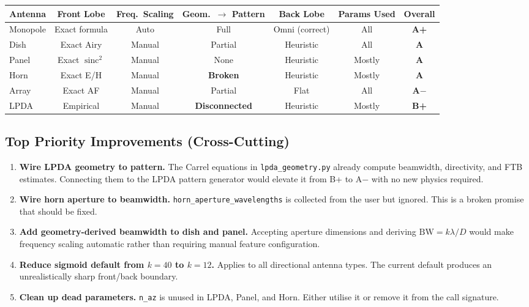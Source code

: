 \documentclass[11pt,a4paper]{article}
\DeclareMathOperator{\sinc}{sinc}
\begin{document}
\begin{center}
\begin{tabular}{@{}lcccccc@{}}
\toprule
\textbf{Antenna} & \textbf{Front Lobe} & \textbf{Freq.\ Scaling} & \textbf{Geom.\ $\to$ Pattern} & \textbf{Back Lobe} & \textbf{Params Used} & \textbf{Overall} \\
\midrule
Monopole & Exact formula   & Auto   & Full    & Omni (correct) & All   & \textbf{A+} \\
Dish     & Exact Airy      & Manual & Partial & Heuristic      & All   & \textbf{A}  \\
Panel    & Exact $\sinc^2$ & Manual & None    & Heuristic      & Mostly & \textbf{A}  \\
Horn     & Exact E/H       & Manual & \textbf{Broken}\footnotemark & Heuristic      & Mostly & \textbf{A}  \\
Array    & Exact AF        & Manual & Partial & Flat           & All   & \textbf{A$-$}  \\
LPDA     & Empirical       & Manual & \textbf{Disconnected} & Heuristic      & Mostly & \textbf{B+} \\
\bottomrule
\end{tabular}
\end{center}

\bigskip

\subsection{Top Priority Improvements (Cross-Cutting)}

\begin{enumerate}
    \item \textbf{Wire LPDA geometry to pattern.} The Carrel equations in \texttt{lpda\_geometry.py} already compute beamwidth, directivity, and FTB estimates. Connecting them to the LPDA pattern generator would elevate it from B+ to A$-$ with no new physics required.

    \item \textbf{Wire horn aperture to beamwidth.} \texttt{horn\_aperture\_wavelengths} is collected from the user but ignored. This is a broken promise that should be fixed.

    \item \textbf{Add geometry-derived beamwidth to dish and panel.} Accepting aperture dimensions and deriving $\text{BW} = k\lambda/D$ would make frequency scaling automatic rather than requiring manual feature configuration.

    \item \textbf{Reduce sigmoid default from $k=40$ to $k=12$.} Applies to all directional antenna types. The current default produces an unrealistically sharp front/back boundary.

    \item \textbf{Clean up dead parameters.} \texttt{n\_az} is unused in LPDA, Panel, and Horn. Either utilise it or remove it from the call signature.
\end{enumerate}
\end{document}

